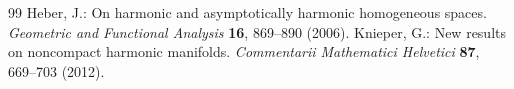 \documentclass[10pt,a4paper]{amsart}
\begin{document}
\begin{thebibliography}{99}
 Heber, J.: On harmonic and asymptotically harmonic homogeneous spaces. \textit{Geometric and Functional Analysis} \textbf{16}, 869--890 (2006).
 Knieper, G.: New results on noncompact harmonic manifolds. \textit{Commentarii Mathematici Helvetici} \textbf{87}, 669--703 (2012).
\end{thebibliography}
\end{document}

